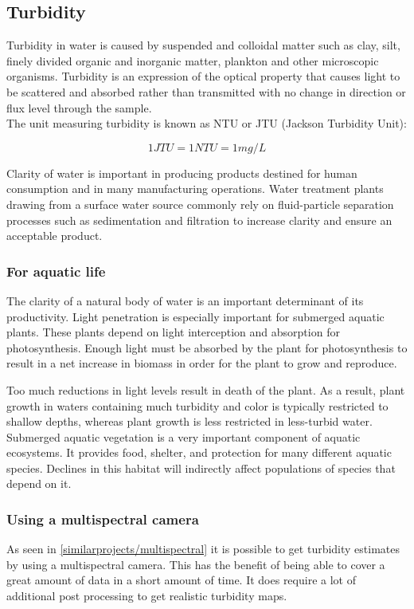 \newpage
\subsection{Turbidity}
Turbidity in water is caused by suspended and colloidal matter such as clay, silt, finely divided organic and inorganic matter, plankton and other microscopic organisms. Turbidity is an expression of the optical property that causes light to be scattered and absorbed rather than transmitted with no change in direction or flux level through the sample. \cite{standardmethods}\\

The unit measuring turbidity is known as NTU or JTU (Jackson Turbidity Unit):

\[1JTU = 1NTU = 1 mg/L\]


Clarity of water is important in producing products destined for human consumption and in many manufacturing operations. \cite{standardmethods} Water treatment plants drawing from a surface water source commonly rely on fluid-particle separation processes such as sedimentation and filtration to increase clarity and ensure an acceptable product.\\


\subsubsection{For aquatic life}

The clarity of a natural body of water is an important determinant of its productivity. Light penetration is especially important for submerged aquatic plants. These plants depend on light interception and absorption for photosynthesis. Enough light must be absorbed by the plant for photosynthesis to result in a net increase in biomass in order for the plant to grow and reproduce. 

Too much reductions in light levels result in death of the plant. As a result, plant growth in waters containing much turbidity and color is typically restricted to shallow depths, whereas plant growth is less restricted in less-turbid water. Submerged aquatic vegetation is a very important component of aquatic ecosystems. It provides food, shelter, and protection for many different aquatic species. Declines in this habitat will indirectly affect populations of species that depend on it. \cite{standardmethods}

\subsubsection{Using a multispectral camera}
As seen in \ref{similarprojects/multispectral} it is possible to get turbidity estimates by using a multispectral camera. This has the benefit of being able to cover a great amount of data in a short amount of time. It does require a lot of additional post processing to get realistic turbidity maps.

